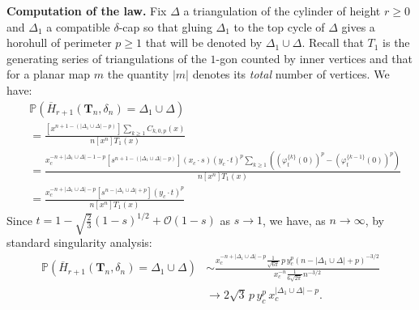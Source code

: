 \documentclass[10pt]{amsart}
\theoremstyle{definition}\newtheorem{defi}[theo]{Definition}\newtheorem{rema}[theo]{Remark}\newtheorem{exam}[theo]{Example}\newtheorem{exem}[theo]{Example}\newtheorem{nota}[theo]{Notation}
\begin{document}
\textbf{Computation of the law.} Fix $\Delta$ a triangulation of the cylinder of height $r \geq 0$ and $\Delta_1$ a compatible $\delta$-cap so that gluing $\Delta_1$ to the top cycle of $\Delta$ gives a horohull of perimeter $p\geq 1$ that will be denoted by $\Delta_1 \cup \Delta$. Recall that $T_1$ is the generating series of triangulations of the $1$-gon counted by inner vertices and that for a planar map $m$ the quantity $|m|$ denotes its \emph{total} number of vertices. We have:
\begin{align*}
& \mathbb P \left( \overline{H}_{r+1} (\mathbf T_n ,\delta_n) = \Delta_1 \cup \Delta \right) \\
&  =
\frac{\left[ x^{n+1-(|\Delta_1 \cup \Delta|-p)}\right] \sum_{k\geq 1} C_{k,0,p} (x) }{n \left[ x^{n} \right] T_1 (x)}\\
& = \frac{
x_c^{-n+|\Delta_1 \cup \Delta|-1-p}
\left[ s^{n+1-(|\Delta_1 \cup \Delta|-p)}\right] (x_c \cdot s) (y_c \cdot t)^p
\sum_{k\geq 1} \left( \left(\varphi_t^{\{k\}} (0) \right)^p - \left(\varphi_t^{\{k-1\}} (0) \right)^p \right) }
{n \left[ x^{n} \right] T_1 (x)}\\
&  =
\frac{
x_c^{-n+|\Delta_1 \cup \Delta|-p}
\left[ s^{n-|\Delta_1 \cup \Delta|+p}\right] (y_c \cdot t)^p
}
{n \left[ x^{n} \right] T_1 (x)}
\end{align*}
Since $t = 1 - \sqrt{\frac{2}{3}} (1-s)^{1/2} + \mathcal O (1-s)$ as $s\to 1$, we have, as $n \to \infty$, by standard singularity analysis:
\begin{align}
\mathbb P \left( \overline{H}_{r+1} (\mathbf T_n ,\delta_n) = \Delta_1 \cup \Delta \right)
&\sim
\frac{
x_c^{-n + |\Delta_1 \cup \Delta| - p }
\frac{1}{\sqrt{6 \pi}} \,p \, y_c^p \left(n-|\Delta_1 \cup \Delta|+p \right)^{-3/2}
}
{x_c^{-n} \frac{1}{6 \sqrt{2 \pi}} n^{-3/2}}\nonumber \\
&\rightarrow 2 \sqrt{3} \, p \, y_c^p \, x_c^{|\Delta_1 \cup \Delta|-p} \label{eq:interessant}.
\end{align}
\end{document}
